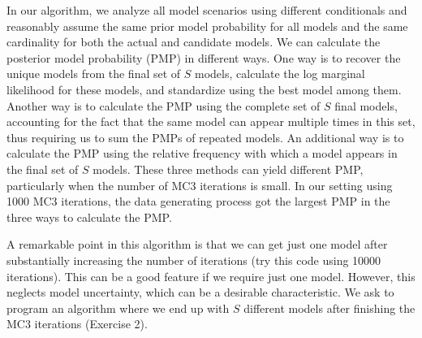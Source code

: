In our algorithm, we analyze all model scenarios using different conditionals and reasonably assume the same prior model probability for all models and the same cardinality for both the actual and candidate models. We can calculate the posterior model probability (PMP) in different ways. One way is to recover the unique models from the final set of $S$ models, calculate the log marginal likelihood for these models, and standardize using the best model among them. Another way is to calculate the PMP using the complete set of $S$ final models, accounting for the fact that the same model can appear multiple times in this set, thus requiring us to sum the PMPs of repeated models. An additional way is to calculate the PMP using the relative frequency with which a model appears in the final set of $S$ models. These three methods can yield different PMP, particularly when the number of MC3 iterations is small. In our setting using 1000 MC3 iterations, the data generating process got the largest PMP in the three ways to calculate the PMP. 

A remarkable point in this algorithm is that we can get just one model after substantially increasing the number of iterations (try this code using 10000 iterations). This can be a good feature if we require just one model. However, this neglects model uncertainty, which can be a desirable characteristic. We ask to program an algorithm where we end up with $S$ different models after finishing the MC3 iterations (Exercise 2).

